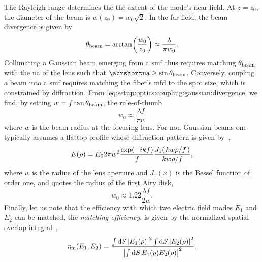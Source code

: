 The Rayleigh range determines the the extent of the mode's near field.
At $z=z_0$, the diameter of the beam is $w(z_0) = w_0\sqrt{2}$.
In the far field, the beam divergence is given by
\begin{equation}\label{eq:setup:optics:coupling:gaussian:divergence}
    \theta_{\mathrm{beam}} = \arctan(\frac{w_0}{z_0}) \approx \frac{\lambda}{\pi w_0}.
\end{equation}
Collimating a Gaussian beam emerging from a \gls{smf} thus requires matching $\theta_{\mathrm{beam}}$ with the \gls{na} of the lens such that $\NA\geq\sin\theta_{\mr{beam}}$.
Conversely, coupling a beam into a \gls{smf} requires matching the fiber's \gls{mfd} to the spot size, which is constrained by diffraction.
From \cref{eq:setup:optics:coupling:gaussian:divergence} we find, by setting $w = f\tan\theta_{\mathrm{beam}}$, the rule-of-thumb
\begin{equation}\label{eq:setup:optics:coupling:gaussian:diffraction_limit}
    w_0 \approx \frac{\lambda f}{\pi w}
\end{equation}
where $w$ is the beam radius at the focusing lens.
For non-Gaussian beams one typically assumes a flattop profile whose diffraction pattern is given by~\cite{Hecht2017},
\begin{equation}\label{eq:setup:optics:coupling:flattop:diffraction_pattern}
    E(\rho) = E_0 2\pi w^2 \frac{\exp(-\i k f)}{f} \frac{J_1(\flatfrac{kw\rho}{f})}{\flatfrac{kw\rho}{f}},
\end{equation}
where $w$ is the radius of the lens aperture and $J_1(x)$ is the Bessel function of order one, and quotes the radius of the first Airy disk,
\begin{equation}\label{eq:setup:optics:coupling:flattop:diffraction_limit}
    w_0 \approx 1.22\frac{\lambda f}{2 w}.
\end{equation}
Finally, let us note that the efficiency with which two electric field modes $E_1$ and $E_2$ can be matched, the \emph{matching efficiency}, is given by the normalized spatial overlap integral~\cite{Paschotta2005},
\begin{equation}\label{eq:setup:optics:coupling:efficiency:mode_matching}
    \eta_{\mathrm{m}}(E_1, E_2) = \frac{\int\dd{S}\abs{E_1(\rho)}^2\int\dd{S}\abs{E_2(\rho)}^2}{\abs{\int\dd{S} E_1(\rho) E_2(\rho)}^2}.
\end{equation}

